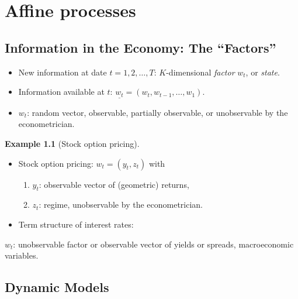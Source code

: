 \documentclass[
  12pt,
]{book}
\providecommand{\tightlist}{%
  \setlength{\itemsep}{0pt}\setlength{\parskip}{0pt}}
\theoremstyle{definition}
\theoremstyle{definition}
\newtheorem{example}{Example}[chapter]
\theoremstyle{definition}
\theoremstyle{definition}
\theoremstyle{remark}
\begin{document}
\hypertarget{affine-processes}{%
\chapter{Affine processes}\label{affine-processes}}

\hypertarget{Information}{%
\section{Information in the Economy: The ``Factors''}\label{Information}}

\begin{itemize}
\tightlist
\item
  New information at date \(t=1,2,\dots,T\): \(K\)-dimensional \emph{factor} \(w_t\), or \emph{state}.
\item
  Information available at \(t\): \(\underline{w_t} = (w_t,w_{t-1},\dots,w_1)\).
\item
  \(w_t\): random vector, observable, partially observable, or unobservable by the econometrician.
\end{itemize}

\begin{example}[Stock option pricing]
\protect\hypertarget{exm:exStockOption}{}\label{exm:exStockOption}\leavevmode

\begin{itemize}
\tightlist
\item
  Stock option pricing: \(w_t = (y_t, z_t)\) with

  \begin{enumerate}
  \def\labelenumi{\arabic{enumi}.}
  \tightlist
  \item
    \(y_t\): observable vector of (geometric) returns,
  \item
    \(z_t\): regime, unobservable by the econometrician.
  \end{enumerate}
\item
  Term structure of interest rates:
\end{itemize}

\(w_t\): unobservable factor or observable vector of yields or spreads, macroeconomic variables.

\end{example}

\hypertarget{Dynamic}{%
\section{Dynamic Models}\label{Dynamic}}
\end{document}
